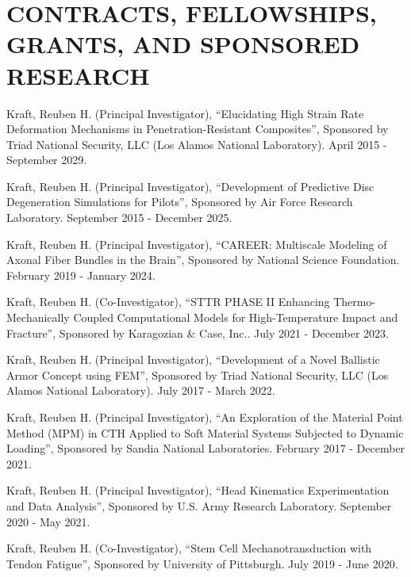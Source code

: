 \documentclass[a4paper,10pt]{article}
\begin{document}
\section*{CONTRACTS, FELLOWSHIPS, GRANTS, AND SPONSORED RESEARCH}

\noindent Kraft, Reuben H. (Principal Investigator), ``Elucidating High Strain Rate Deformation Mechanisms in Penetration-Resistant Composites'', Sponsored by Triad National Security, LLC (Los Alamos National Laboratory). April 2015 - September 2029.\vspace{0.25cm}

\noindent Kraft, Reuben H. (Principal Investigator), ``Development of Predictive Disc Degeneration Simulations for Pilots'', Sponsored by Air Force Research Laboratory. September 2015 - December 2025.\vspace{0.25cm}

\noindent Kraft, Reuben H. (Principal Investigator), ``CAREER: Multiscale Modeling of Axonal Fiber Bundles in the Brain'', Sponsored by National Science Foundation. February 2019 - January 2024.\vspace{0.25cm}

\noindent Kraft, Reuben H. (Co-Investigator), ``STTR PHASE II Enhancing Thermo-Mechanically Coupled Computational Models for High-Temperature Impact and Fracture'', Sponsored by Karagozian \& Case, Inc.. July 2021 - December 2023.\vspace{0.25cm}

\noindent Kraft, Reuben H. (Principal Investigator), ``Development of a Novel Ballistic Armor Concept using FEM'', Sponsored by Triad National Security, LLC (Los Alamos National Laboratory). July 2017 - March 2022.\vspace{0.25cm}

\noindent Kraft, Reuben H. (Principal Investigator), ``An Exploration of the Material Point Method (MPM) in CTH Applied to Soft Material Systems Subjected to Dynamic Loading'', Sponsored by Sandia National Laboratories. February 2017 - December 2021.\vspace{0.25cm}

\noindent Kraft, Reuben H. (Principal Investigator), ``Head Kinematics Experimentation and Data Analysis'', Sponsored by U.S. Army Research Laboratory. September 2020 - May 2021.\vspace{0.25cm}

\noindent Kraft, Reuben H. (Co-Investigator), ``Stem Cell Mechanotransduction with Tendon Fatigue'', Sponsored by University of Pittsburgh. July 2019 - June 2020.\vspace{0.25cm}
\end{document}

